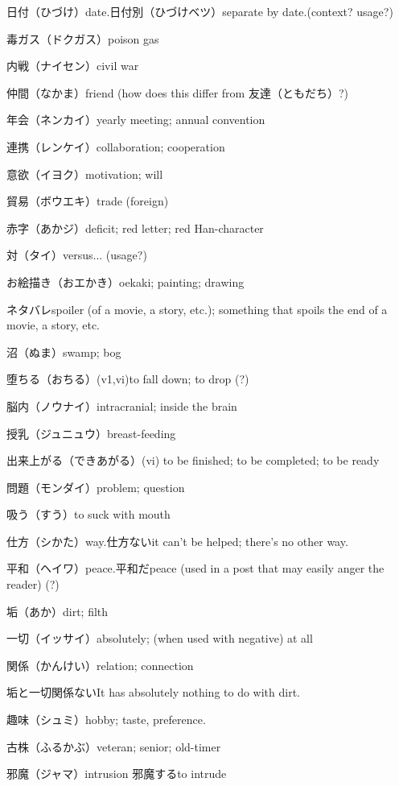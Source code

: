 日付（ひづけ）date.日付別（ひづけベツ）separate by date.(context? usage?)

毒ガス（ドクガス）poison gas

内戦（ナイセン）civil war

仲間（なかま）friend (how does this differ from 友達（ともだち）?)

年会（ネンカイ）yearly meeting; annual convention

連携（レンケイ）collaboration; cooperation

意欲（イヨク）motivation; will

貿易（ボウエキ）trade (foreign)

赤字（あかジ）deficit; red letter; red Han-character

対（タイ）versus... (usage?)

お絵描き（おエかき）oekaki; painting; drawing

ネタバレspoiler (of a movie, a story, etc.); something that spoils the end of a movie, a story, etc.

沼（ぬま）swamp; bog

堕ちる（おちる）(v1,vi)to fall down; to drop (?)

脳内（ノウナイ）intracranial; inside the brain

授乳（ジュニュウ）breast-feeding

出来上がる（できあがる）(vi) to be finished; to be completed; to be ready

問題（モンダイ）problem; question

吸う（すう）to suck with mouth

仕方（シかた）way.仕方ないit can't be helped; there's no other way.

平和（ヘイワ）peace.平和だpeace (used in a post that may easily anger the reader) (?)

垢（あか）dirt; filth

一切（イッサイ）absolutely; (when used with negative) at all

関係（かんけい）relation; connection

垢と一切関係ないIt has absolutely nothing to do with dirt.

趣味（シュミ）hobby; taste, preference.

古株（ふるかぶ）veteran; senior; old-timer

邪魔（ジャマ）intrusion
邪魔するto intrude
